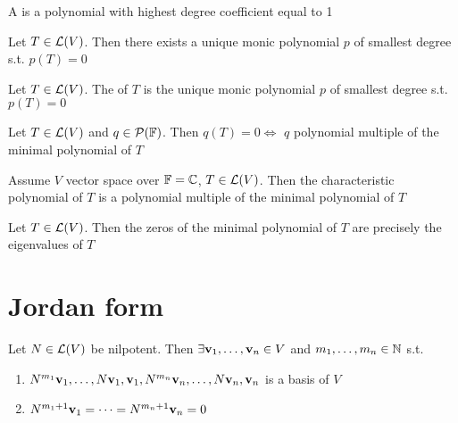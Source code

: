 \documentclass[aspectratio=169]{beamer}
\begin{document}
\begin{frame}
\begin{definition}
A  is a polynomial with highest degree coefficient equal to 1
\end{definition}

\begin{theorem}
Let $T\in\mathcal{L}(V)$. Then there exists a unique monic polynomial $p$ of smallest degree s.t. $p(T)=0$
\end{theorem}

\begin{definition}
Let $T\in\mathcal{L}(V)$. The  of $T$ is the unique monic polynomial $p$ of smallest degree s.t. $p(T)=0$
\end{definition}

\begin{theorem}
Let $T\in\mathcal{L}(V)$ and $q\in\mathcal{P}(\mathbb{F})$. Then $q(T)=0\Leftrightarrow$ $q$ polynomial multiple of the minimal polynomial of $T$
\end{theorem}
\end{frame}


\begin{frame}
\begin{theorem}
Assume $V$ vector space over $\mathbb{F}=\mathbb{C}$, $T\in\mathcal{L}(V)$. Then the characteristic polynomial of $T$ is a polynomial multiple of the minimal polynomial of $T$
\end{theorem}
\vfill
\begin{theorem}
Let $T\in\mathcal{L}(V)$. Then the zeros of the minimal polynomial of $T$ are precisely the eigenvalues of $T$
\end{theorem}
\end{frame}

\section{Jordan form}


\begin{frame}
\begin{theorem}
Let $N\in\mathcal{L}(V)$ be nilpotent. Then $\exists\mathbf{v}_1,\ldots,\mathbf{v}_n\in V$ and $m_1,\ldots,m_n\in\mathbb{N}$ s.t.
\begin{enumerate}
\item $N^{m_1}\mathbf{v}_1,\ldots,N\mathbf{v}_1,\mathbf{v}_1,N^{m_n}\mathbf{v}_n,\ldots,N\mathbf{v}_n,\mathbf{v}_n$ is a basis of $V$
\item $N^{m_1+1}\mathbf{v}_1=\cdots=N^{m_n+1}\mathbf{v}_n=0$
\end{enumerate}
\end{theorem}
\end{frame}
\end{document}
